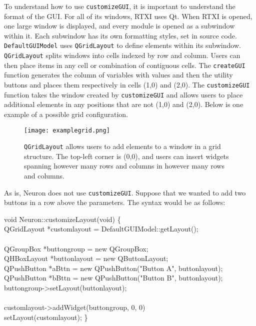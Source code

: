 To understand how to use \texttt{customizeGUI}, it is important to understand the format of the GUI. For all of its windows, RTXI uses Qt. When RTXI is opened, one large window is displayed, and every module is opened as a subwindow within it. Each subwindow has its own formatting styles, set in source code. \texttt{DefaultGUIModel} uses \texttt{QGridLayout} to define elements within its subwindow. \texttt{QGridLayout} splits windows into cells indexed by row and column. Users can then place items in any cell or combination of contiguous cells. The \texttt{createGUI} function generates the column of variables with values and then the utility buttons and places them respectively in cells (1,0) and (2,0). The \texttt{customizeGUI} function takes the window created by \texttt{customizeGUI} and allows users to place additional elements in any positions that are not (1,0) and (2,0). Below is one example of a possible grid configuration.

\begin{figure}[h!] 
\begin{center}
\label{QGridLayout}
\texttt{[image: examplegrid.png]} 
\caption[Example QGridLayout]{\texttt{QGridLayout} allows users to add elements to a window in a grid structure. The top-left corner is (0,0), and users can insert widgets spanning however many rows and columns in however many rows and columns.} 
\end{center}
\end{figure}

As is, Neuron does not use \texttt{customizeGUI}. Suppose that we wanted to add two buttons in a row above the parameters. The syntax would be as follows:

\begin{example}
void Neuron::customizeLayout(void) \{\\
\hspace{.5cm}QGridLayout *customlayout = DefaultGUIModel::getLayout();\\
\hspace{.5cm}\\
\hspace{.5cm}QGroupBox *buttongroup = new QGroupBox;\\
\hspace{.5cm}QHBoxLayout *buttonlayout = new QButtonLayout;\\
\hspace{.5cm}QPushButton *aBttn = new QPushButton("Button A", buttonlayout);\\
\hspace{.5cm}QPushButton *bBttn = new QPushButton("Button B", buttonlayout);\\
\hspace{.5cm}buttongroup->setLayout(buttonlayout);\\
\hspace{.5cm}\\
\hspace{.5cm}customlayout->addWidget(buttongroup, 0, 0)\\
\hspace{.5cm}setLayout(customlayout);
\}\\
\end{example}

